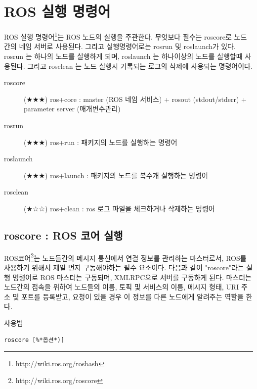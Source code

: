 \section{ROS 실행 명령어}

ROS 실행 명령어\footnote{http://wiki.ros.org/rosbash}는 ROS 노드의 실행을 주관한다. 무엇보다 필수는 roscore로 노드간의 네임 서버로 사용된다. 그리고 실행명령어로는 rosrun 및 roslaunch가 있다. rosrun 는 하나의 노드를 실행하게 되며, roslaunch 는 하나이상의 노드를 실행할때 사용된다. 그리고 rosclean 는 노드 실행시 기록되는 로그의 삭제에 사용되는 명령어이다.

\vspace{\baselineskip}
\noindent
\begin{description}
\item[roscore] (★★★) ros+core : master (ROS 네임 서비스) + rosout (stdout/stderr) + parameter server (매개변수관리)
\item[rosrun] (★★★) ros+run : 패키지의 노드를 실행하는 명령어
\item[roslaunch] (★★★) ros+launch : 패키지의 노드를 복수개 실행하는 명령어
\item[rosclean] (★☆☆) ros+clean : ros 로그 파일을 체크하거나 삭제하는 명령어
\end{description}

\newpage
\subsection{roscore : ROS 코어 실행}
\label{subsec:Roscore}

ROS코어\footnote{http://wiki.ros.org/roscore}는 노드들간의 메시지 통신에서 연결 정보를 관리하는 마스터로서, ROS를 사용하기 위해서 제일 먼저 구동해야하는 필수 요소이다. 다음과 같이 "roscore"라는 실행 명령어로 ROS 마스터는 구동되며, XMLRPC으로 서버를 구동하게 된다. 마스터는 노드간의 접속을 위하여 노드들의 이름, 토픽 및 서비스의 이름, 메시지 형태, URI 주소 및 포트를  등록받고, 요청이 있을 경우 이 정보를 다른 노드에게 알려주는 역할을 한다. 

\setcounter{num}{0}

\vspace{\baselineskip}
\noindent
{}\circled{\thenum} 사용법
\begin{lstlisting}[language=ROS]
roscore [%*옵션*)]
\end{lstlisting}

